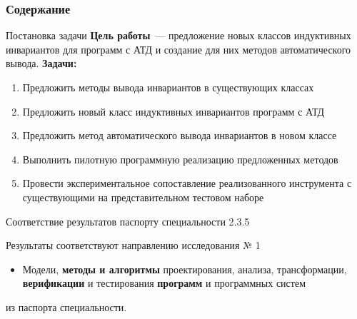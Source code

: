 \documentclass[22pt,aspectratio=169]{beamer}
\begin{document}
\togglefalse{fastCompile}



\begin{frame}[plain]
\titlepage
\end{frame}

\begin{frame}
\frametitle{Содержание}
\tableofcontents[
subsectionstyle=show/show/hide
]
\end{frame}


\whenFullCompile{}


\begin{framesection}{Постановка задачи}
\textbf{Цель работы}~--- предложение новых классов индуктивных инвариантов для программ с АТД и создание для них методов автоматического вывода. \textbf{Задачи:}

\begin{enumerate}
\item Предложить методы вывода инвариантов в существующих классах
\item Предложить новый класс индуктивных инвариантов программ с АТД
\item Предложить метод автоматического вывода инвариантов в новом классе
\item Выполнить пилотную программную реализацию предложенных методов
\item Провести экспериментальное сопоставление реализованного инструмента с существующими на представительном тестовом наборе
\end{enumerate}
\end{framesection}







\begin{frame}{Соответствие результатов паспорту специальности 2.3.5}

Результаты соответствуют направлению исследования  № 1
\begin{itemize}
\item Модели, \textbf{методы и алгоритмы} проектирования, анализа, трансформации, \textbf{верификации} и тестирования \textbf{программ} и программных систем
\end{itemize}
из паспорта специальности.
\end{frame}
\end{document}
